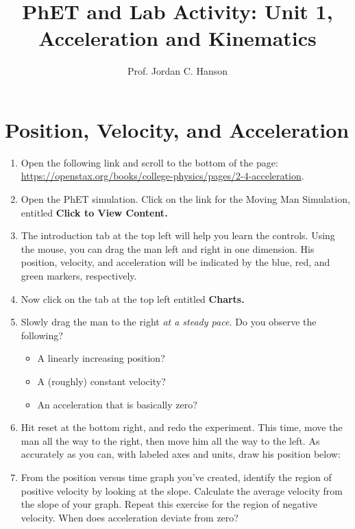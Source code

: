 \documentclass{article}
\begin{document}
\title{PhET and Lab Activity: Unit 1, Acceleration and Kinematics}
\author{Prof. Jordan C. Hanson}

\maketitle

\section{Position, Velocity, and Acceleration}

\begin{enumerate}
\item Open the following link and scroll to the bottom of the page: \url{https://openstax.org/books/college-physics/pages/2-4-acceleration}.  
\item Open the PhET simulation.  Click on the link for the Moving Man Simulation, entitled \textbf{Click to View Content.}
\item The introduction tab at the top left will help you learn the controls.  Using the mouse, you can drag the man left and right in one dimension.  His position, velocity, and acceleration will be indicated by the blue, red, and green markers, respectively.
\item Now click on the tab at the top left entitled \textbf{Charts.}
\item Slowly drag the man to the right \textit{at a steady pace.}  Do you observe the following?
\begin{itemize}
\item A linearly increasing position?
\item A (roughly) constant velocity?
\item An acceleration that is basically zero?
\end{itemize}
\item Hit reset at the bottom right, and redo the experiment.  This time, move the man all the way to the right, then move him all the way to the left.  As accurately as you can, with labeled axes and units, draw his position below: \\ \vspace{2.0cm}
\item From the position versus time graph you've created, identify the region of positive velocity by looking at the slope.  Calculate the average velocity from the slope of your graph.  Repeat this exercise for the region of negative velocity.  When does acceleration deviate from zero?
\end{enumerate}
\end{document}

